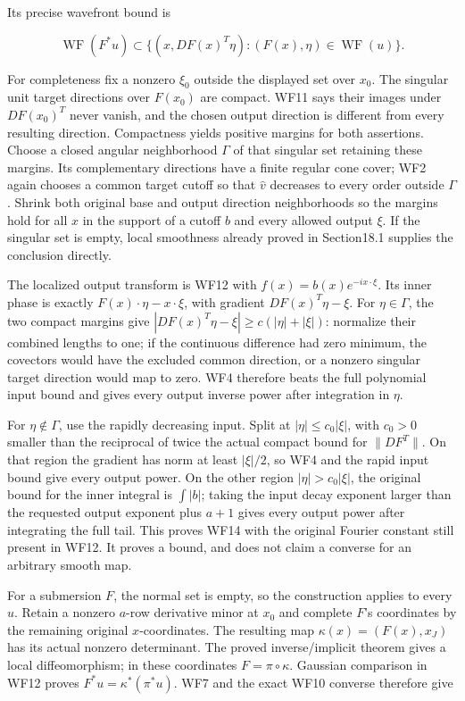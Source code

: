 \documentclass[
  11pt,
]{article}
\begin{document}
Its precise wavefront bound is

\[
\operatorname{WF}(F^*u)
\subset\{(x,DF(x)^T\eta):(F(x),\eta)\in\operatorname{WF}(u)\}.
\tag{WF14}
\]

For completeness fix a nonzero \(\xi_0\) outside the displayed set over
\(x_0\). The singular unit target directions over \(F(x_0)\) are
compact. WF11 says their images under \(DF(x_0)^T\) never vanish, and
the chosen output direction is different from every resulting direction.
Compactness yields positive margins for both assertions. Choose a closed
angular neighborhood \(\Gamma\) of that singular set retaining these
margins. Its complementary directions have a finite regular cone cover;
WF2 again chooses a common target cutoff so that \(\widehat v\)
decreases to every order outside \(\Gamma\). Shrink both original base
and output direction neighborhoods so the margins hold for all \(x\) in
the support of a cutoff \(b\) and every allowed output \(\xi\). If the
singular set is empty, local smoothness already proved in Section18.1
supplies the conclusion directly.

The localized output transform is WF12 with
\(f(x)=b(x)e^{-ix\cdot\xi}\). Its inner phase is exactly
\(F(x)\cdot\eta-x\cdot\xi\), with gradient \(DF(x)^T\eta-\xi\). For
\(\eta\in\Gamma\), the two compact margins give
\(|DF(x)^T\eta-\xi|\geq c(|\eta|+|\xi|)\): normalize their combined
lengths to one; if the continuous difference had zero minimum, the
covectors would have the excluded common direction, or a nonzero
singular target direction would map to zero. WF4 therefore beats the
full polynomial input bound and gives every output inverse power after
integration in \(\eta\).

For \(\eta\notin\Gamma\), use the rapidly decreasing input. Split at
\(|\eta|\leq c_0|\xi|\), with \(c_0>0\) smaller than the reciprocal of
twice the actual compact bound for \(\|DF^T\|\). On that region the
gradient has norm at least \(|\xi|/2\), so WF4 and the rapid input bound
give every output power. On the other region \(|\eta|>c_0|\xi|\), the
original bound for the inner integral is \(\int|b|\); taking the input
decay exponent larger than the requested output exponent plus \(a+1\)
gives every output power after integrating the full tail. This proves
WF14 with the original Fourier constant still present in WF12. It proves
a bound, and does not claim a converse for an arbitrary smooth map.

For a submersion \(F\), the normal set is empty, so the construction
applies to every \(u\). Retain a nonzero \(a\)-row derivative minor at
\(x_0\) and complete \(F\)'s coordinates by the remaining original
\(x\)-coordinates. The resulting map \(\kappa(x)=(F(x),x_J)\) has its
actual nonzero determinant. The proved inverse/implicit theorem gives a
local diffeomorphism; in these coordinates \(F=\pi\circ\kappa\).
Gaussian comparison in WF12 proves \(F^*u=\kappa^*(\pi^*u)\). WF7 and
the exact WF10 converse therefore give
\end{document}
